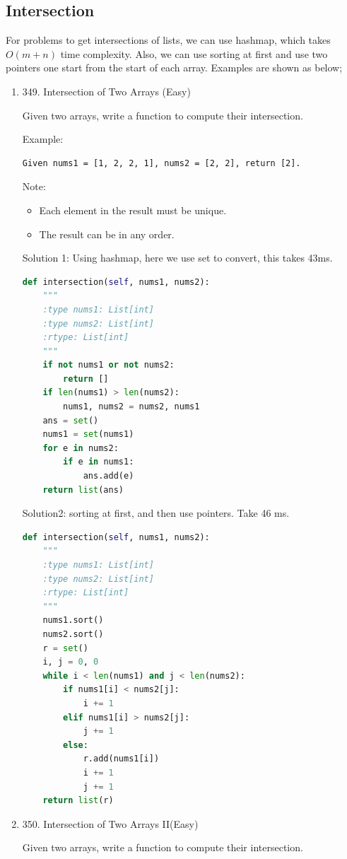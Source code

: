 \documentclass[../specific-algorithms.tex]{subfiles}
\begin{document}
\subsection{Intersection}
For problems to get intersections of lists, we can use hashmap, which takes $O(m+n)$ time complexity. Also, we can use sorting at first and use two pointers one start from the start of each array. Examples are shown as below;
\begin{enumerate}
    \item  349. Intersection of Two Arrays (Easy)
    
     Given two arrays, write a function to compute their intersection.

Example:
\begin{lstlisting}
Given nums1 = [1, 2, 2, 1], nums2 = [2, 2], return [2].
\end{lstlisting}

Note:
\begin{itemize}
    \item Each element in the result must be unique.
    \item The result can be in any order.
\end{itemize}
Solution 1: Using hashmap, here we use set to convert, this takes 43ms. 
\begin{lstlisting}[language = Python]
def intersection(self, nums1, nums2):
    """
    :type nums1: List[int]
    :type nums2: List[int]
    :rtype: List[int]
    """
    if not nums1 or not nums2:
        return []
    if len(nums1) > len(nums2):
        nums1, nums2 = nums2, nums1
    ans = set()
    nums1 = set(nums1)
    for e in nums2:
        if e in nums1:
            ans.add(e)
    return list(ans)
\end{lstlisting}
Solution2: sorting at first, and then use pointers. Take 46 ms. 
\begin{lstlisting}[language = Python]
def intersection(self, nums1, nums2):
    """
    :type nums1: List[int]
    :type nums2: List[int]
    :rtype: List[int]
    """
    nums1.sort()
    nums2.sort()
    r = set()
    i, j = 0, 0
    while i < len(nums1) and j < len(nums2):
        if nums1[i] < nums2[j]:
            i += 1
        elif nums1[i] > nums2[j]:
            j += 1
        else:
            r.add(nums1[i])
            i += 1
            j += 1
    return list(r)
\end{lstlisting}
\item 350. Intersection of Two Arrays II(Easy)

 Given two arrays, write a function to compute their intersection.


\end{enumerate}
\end{document}

